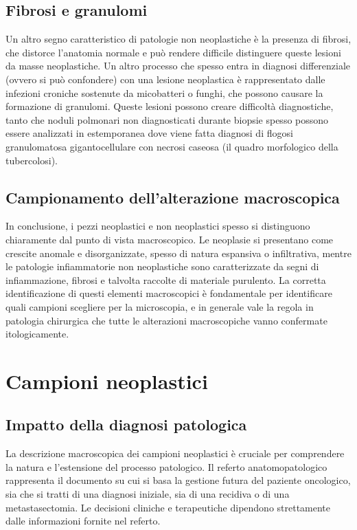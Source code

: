 \subsection{Fibrosi e granulomi}
Un altro segno caratteristico di patologie non neoplastiche è la presenza di fibrosi, che distorce l'anatomia normale e può rendere difficile distinguere queste lesioni da masse neoplastiche. Un altro processo che spesso entra in diagnosi differenziale (ovvero si può confondere) con una lesione neoplastica è rappresentato dalle infezioni croniche sostenute da micobatteri o funghi, che possono causare la formazione di granulomi. Queste lesioni possono creare difficoltà diagnostiche, tanto che noduli polmonari non diagnosticati durante biopsie spesso possono essere analizzati in estemporanea dove viene fatta diagnosi di flogosi granulomatosa gigantocellulare con necrosi caseosa (il quadro morfologico della tubercolosi).

\subsection{Campionamento dell'alterazione macroscopica}
In conclusione, i pezzi neoplastici e non neoplastici spesso si distinguono chiaramente dal punto di vista macroscopico. Le neoplasie si presentano come crescite anomale e disorganizzate, spesso di natura espansiva o infiltrativa, mentre le patologie infiammatorie non neoplastiche sono caratterizzate da segni di infiammazione, fibrosi e talvolta raccolte di materiale purulento. La corretta identificazione di questi elementi macroscopici è fondamentale per identificare quali campioni scegliere per la microscopia, e in generale vale la regola in patologia chirurgica che tutte le alterazioni macroscopiche vanno confermate itologicamente.

\section{Campioni neoplastici}

\subsection{Impatto della diagnosi patologica}
La descrizione macroscopica dei campioni neoplastici è cruciale per comprendere la natura e l'estensione del processo patologico. Il referto anatomopatologico rappresenta il documento su cui si basa la gestione futura del paziente oncologico, sia che si tratti di una diagnosi iniziale, sia di una recidiva o di una metastasectomia. Le decisioni cliniche e terapeutiche dipendono strettamente dalle informazioni fornite nel referto.

